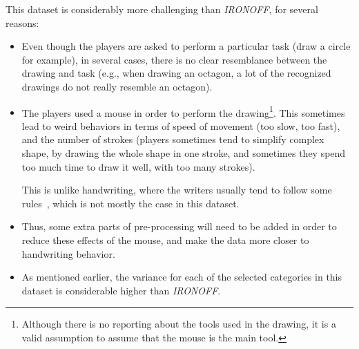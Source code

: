 \par This dataset is considerably more challenging than \textit{IRONOFF}, for several reasons:
\begin{itemize}[noitemsep]
    \item Even though the players are asked to perform a particular task (draw a circle for example), in several cases, there is no clear resemblance between the drawing and task (e.g., when drawing an octagon, a lot of the recognized drawings do not really resemble an octagon).
    \item The players used a mouse in order to perform the drawing\footnote{Although there is no reporting about the tools used in the drawing, it is a valid assumption to assume that the mouse is the main tool.}. This sometimes lead to weird behaviors in terms of speed of movement (too slow, too fast), and the number of strokes (players sometimes tend to simplify complex shape, by drawing the whole shape in one stroke, and sometimes they spend too much time to draw it well, with too many strokes).

    This is unlike handwriting, where the writers usually tend to follow some rules~\citep{seraphin2019analyzing}, which is not mostly the case in this dataset.

    \item Thus, some extra parts of pre-processing will need to be added in order to reduce these effects of the mouse, and make the data more closer to handwriting behavior.

    \item As mentioned earlier, the variance for each of the selected categories in this dataset is considerable higher than \textit{IRONOFF}.
\end{itemize}


